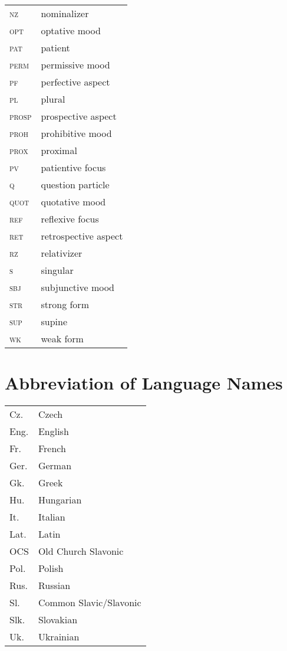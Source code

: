 \begin{longtabu} {>{\scshape}YY[2.5]}
	nz		& nominalizer\\
	opt		& optative mood\\
	pat		& patient\\
	perm	& permissive mood\\
	pf		& perfective aspect\\
	pl		& plural\\
	prosp	& prospective aspect\\
	proh	& prohibitive mood\\
	prox	& proximal\\
	pv		& patientive focus\\
	q			& question particle\\
	quot	& quotative mood\\
	ref		& reflexive focus\\
	ret		& retrospective aspect\\
	rz		& relativizer\\
	s		& singular\\
	sbj		& subjunctive mood\\
	str		& strong form\\
	sup		& supine\\
	wk		& weak form\\
\end{longtabu}

\clearpage

\section*{Abbreviation of Language Names}
\begin{longtabu} {YY[2.5]}
	Cz.		& Czech\\
	Eng.	& English\\
	Fr.		& French\\
	Ger.	& German\\
	Gk.		& Greek\\
	Hu.		& Hungarian\\
	It.		& Italian\\
	Lat.	& Latin\\
	OCS		& Old Church Slavonic\\
	Pol.	& Polish\\
	Rus.	& Russian\\
	Sl.		& Common Slavic/Slavonic\\
	Slk.	& Slovakian\\
	Uk.		& Ukrainian\\
\end{longtabu}


